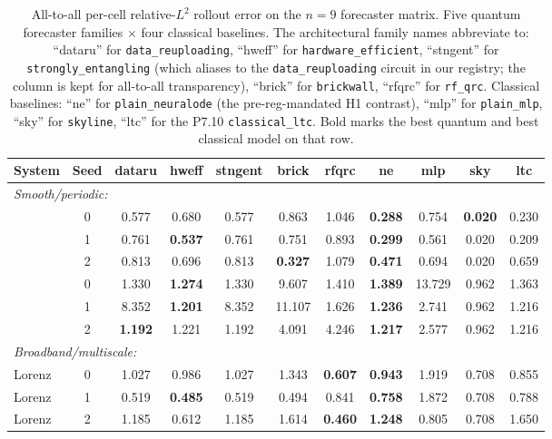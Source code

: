 \begin{table}[t]
\centering
\caption{All-to-all per-cell relative-$L^2$ rollout error on the
$n=9$ forecaster matrix. Five quantum forecaster families
$\times$ four classical baselines. The architectural family names
abbreviate to: ``dataru'' for \texttt{data\_reuploading},
``hweff'' for \texttt{hardware\_efficient}, ``stngent'' for
\texttt{strongly\_entangling} (which aliases to the
\texttt{data\_reuploading} circuit in our registry; the column is
kept for all-to-all transparency), ``brick'' for \texttt{brickwall},
``rfqrc'' for \texttt{rf\_qrc}. Classical baselines:
``ne'' for \texttt{plain\_neuralode} (the pre-reg-mandated H1
contrast), ``mlp'' for \texttt{plain\_mlp}, ``sky'' for
\texttt{skyline}, ``ltc'' for the P7.10
\texttt{classical\_ltc}. Bold marks the best quantum and best
classical model on that row.}
\label{tab:forecaster-matrix}
\scriptsize
\setlength{\tabcolsep}{3pt}
\begin{tabular}{lc|ccccc|cccc}
\toprule
System & Seed & dataru & hweff & stngent & brick & rfqrc &
ne & mlp & sky & ltc \\
\midrule
\multicolumn{11}{l}{\emph{Smooth/periodic:}} \\
\lv{}     & 0 & 0.577 & 0.680 & 0.577 & 0.863 & 1.046 &
                \textbf{0.288} & 0.754 & \textbf{0.020} & 0.230 \\
\lv{}     & 1 & 0.761 & \textbf{0.537} & 0.761 & 0.751 & 0.893 &
                \textbf{0.299} & 0.561 & 0.020 & 0.209 \\
\lv{}     & 2 & 0.813 & 0.696 & 0.813 & \textbf{0.327} & 1.079 &
                \textbf{0.471} & 0.694 & 0.020 & 0.659 \\
\vdp{}    & 0 & 1.330 & \textbf{1.274} & 1.330 & 9.607 & 1.410 &
                \textbf{1.389} & 13.729 & 0.962 & 1.363 \\
\vdp{}    & 1 & 8.352 & \textbf{1.201} & 8.352 & 11.107 & 1.626 &
                \textbf{1.236} & 2.741 & 0.962 & 1.216 \\
\vdp{}    & 2 & \textbf{1.192} & 1.221 & 1.192 & 4.091 & 4.246 &
                \textbf{1.217} & 2.577 & 0.962 & 1.216 \\
\midrule
\multicolumn{11}{l}{\emph{Broadband/multiscale:}} \\
Lorenz    & 0 & 1.027 & 0.986 & 1.027 & 1.343 & \textbf{0.607} &
                \textbf{0.943} & 1.919 & 0.708 & 0.855 \\
Lorenz    & 1 & 0.519 & \textbf{0.485} & 0.519 & 0.494 & 0.841 &
                \textbf{0.758} & 1.872 & 0.708 & 0.788 \\
Lorenz    & 2 & 1.185 & 0.612 & 1.185 & 1.614 & \textbf{0.460} &
                \textbf{1.248} & 0.805 & 0.708 & 1.650 \\
\bottomrule
\end{tabular}
\end{table}

